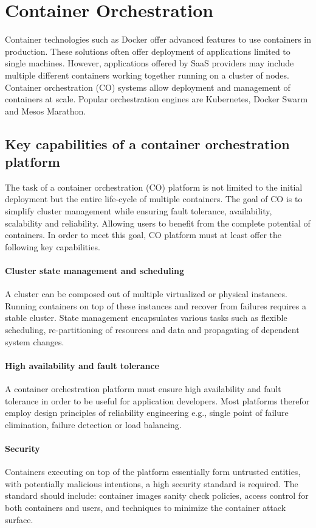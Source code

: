 \section{Container Orchestration}
Container technologies such as Docker offer advanced features to use containers in production. These solutions often offer deployment of applications limited to single machines. However, applications offered by  SaaS providers may include multiple different containers working together running on a cluster of nodes. Container orchestration (CO) systems allow deployment and management of containers at scale. Popular orchestration engines are Kubernetes, Docker Swarm and Mesos Marathon.
\subsection{Key capabilities of a container orchestration platform}
The task of a container orchestration (CO) platform is not limited to the initial deployment but the entire life-cycle of multiple containers. The goal of CO is to simplify cluster management while ensuring fault tolerance, availability, scalability and reliability. Allowing users to benefit from the complete potential of containers. In order to meet this goal, CO platform must at least offer the following key capabilities.~\cite{khan2017key}
\paragraph{Cluster state management and scheduling}
A cluster can be composed out of multiple virtualized or physical instances. Running containers on top of these instances and recover from failures requires a stable cluster. State management encapsulates various tasks such as flexible scheduling, re-partitioning of resources and data and propagating of dependent system changes.~\cite{khan2017key} 
\paragraph{High availability and fault tolerance}
A container orchestration platform must ensure high availability and fault tolerance in order to be useful for application developers. Most platforms therefor employ design principles of reliability engineering e.g., single point of failure elimination, failure detection or load balancing.~\cite{khan2017key}
\paragraph{Security}
Containers executing on top of the platform essentially form untrusted entities, with potentially malicious intentions, a high security standard is required. The standard should include: container images sanity check policies, access control for both containers and users, and techniques to minimize the container attack surface.~\cite{khan2017key}  
